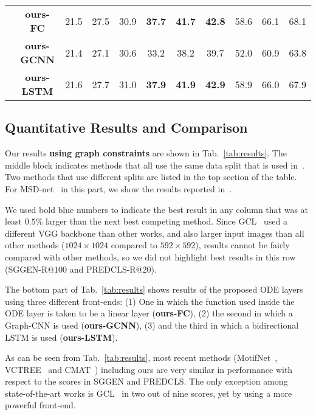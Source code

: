\documentclass[runningheads]{llncs}
\begin{document}
\begin{table*}[!ht]
\begin{threeparttable}
\begin{tabular}{ccccccccccc}
\midrule
&\textbf{ours-FC}                      & 21.5 & 27.5 & 30.9 & {\color{blue} \textbf{37.7} } & {\color{blue} \textbf{41.7} } & {\color{blue} \textbf{42.8} } & 58.6 & 66.1 & 68.1 \\
&\textbf{ours-GCNN}                     & 21.4 & 27.1 & 30.6 & 33.2 & 38.2 & 39.7 & 52.0 & 60.9 & 63.8 \\
&\textbf{ours-LSTM}                      & 21.6 & 27.7 & 31.0 & {\color{blue} \textbf{37.9}} & {\color{blue} \textbf{41.9}} & {\color{blue} \textbf{42.9} } & 58.9 & 66.0 & 67.9 \\
\bottomrule
\end{tabular}
\end{threeparttable}
\end{table*}




\subsection{Quantitative Results and Comparison}
\label{subsec:results}


Our results \textbf{using graph constraints} are shown in Tab.~\ref{tab:results}. The middle block indicates methods that all use the same data split that is used in~\cite{xu2017scene}. Two methods that use different splits are listed in the top section of the table. For MSD-net~\cite{li2017scene} in this part, we show the results reported in~\cite{zellers2018neural}. 

We used bold blue numbers to indicate the best result in any column that was at least $0.5\%$ larger than the next best competing method. 
Since GCL~\cite{Zhang2019:GCL} used a different VGG backbone than other works, and also larger input images than all other methods ($1024 \times 1024$ compared to $592 \times 592$), results cannot be fairly compared with other methods, so we did not highlight best results in this row (SGGEN-R@100 and PREDCLS-R@20).

The bottom part of Tab.~\ref{tab:results} shows results of the proposed ODE layers using three different front-ends: (1) One in which the function used inside the ODE layer is taken to be a linear layer (\textbf{ours-FC}), (2) the second in which a Graph-CNN is used (\textbf{ours-GCNN}), (3) and the third in which a  bidirectional LSTM is used (\textbf{ours-LSTM}).

As can be seen from Tab.~\ref{tab:results}, most recent methods (MotifNet~\cite{zellers2018neural}, VCTREE~\cite{Tang_2019_CVPR} and CMAT~\cite{chen2019counterfactual}) including ours are very similar in performance with respect to the scores in SGGEN and PREDCLS. 
The only exception among state-of-the-art works is GCL~\cite{Zhang2019:GCL} in two out of nine scores, yet by using a more powerful front-end. 
\end{document}
